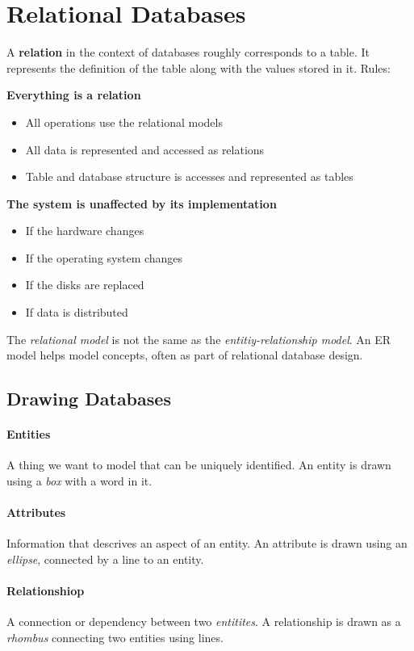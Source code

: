 \section{Relational Databases}

A \textbf{relation} in the context of databases roughly corresponds to a table. It represents the definition of the table along with the values stored in it. Rules:

\textbf{Everything is a relation}

\begin{itemize}
    \item All operations use the relational models
    \item All data is represented and accessed as relations
    \item Table and database structure is accesses and represented as tables
\end{itemize}

\textbf{The system is unaffected by its implementation}

\begin{itemize}
    \item If the hardware changes 
    \item If the operating system changes 
    \item If the disks are replaced
    \item If data is distributed 
\end{itemize}

The \textit{relational model} is not the same as the \textit{entitiy-relationship model}. An ER model helps model concepts, often as part of relational database design.

\subsection{Drawing Databases}

\paragraph{Entities} A thing we want to model that can be uniquely identified. An entity is drawn using a \textit{box} with a word in it.

\paragraph{Attributes} Information that descrives an aspect of an entity. An attribute is drawn using an \textit{ellipse}, connected by a line to an entity.

\paragraph{Relationshiop} A connection or dependency between two \textit{entitites}. A relationship is drawn as a \textit{rhombus} connecting two entities using lines.





